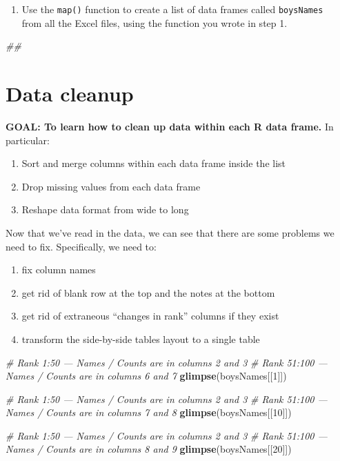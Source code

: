 \documentclass[
]{book}
\newenvironment{Shaded}{\begin{snugshade}}{\end{snugshade}}
\newcommand{\CommentTok}[1]{\textcolor[rgb]{0.56,0.35,0.01}{\textit{#1}}}
\newcommand{\DecValTok}[1]{\textcolor[rgb]{0.00,0.00,0.81}{#1}}
\newcommand{\KeywordTok}[1]{\textcolor[rgb]{0.13,0.29,0.53}{\textbf{#1}}}
\newcommand{\NormalTok}[1]{#1}
\providecommand{\tightlist}{%
  \setlength{\itemsep}{0pt}\setlength{\parskip}{0pt}}
\begin{document}
\begin{enumerate}
\def\labelenumi{\arabic{enumi}.}
\setcounter{enumi}{2}
\tightlist
\item
  Use the \texttt{map()} function to create a list of data frames called \texttt{boysNames}\\
  from all the Excel files, using the function you wrote in step 1.
\end{enumerate}

\begin{Shaded}
\begin{Highlighting}[]
\CommentTok{## }
\end{Highlighting}
\end{Shaded}

\hypertarget{data-cleanup}{%
\section{Data cleanup}\label{data-cleanup}}

\textbf{GOAL: To learn how to clean up data within each R data frame.} In particular:

\begin{enumerate}
\def\labelenumi{\arabic{enumi}.}
\tightlist
\item
  Sort and merge columns within each data frame inside the list
\item
  Drop missing values from each data frame
\item
  Reshape data format from wide to long
\end{enumerate}

Now that we've read in the data, we can see that there are some
problems we need to fix. Specifically, we need to:

\begin{enumerate}
\def\labelenumi{\arabic{enumi}.}
\tightlist
\item
  fix column names
\item
  get rid of blank row at the top and the notes at the bottom
\item
  get rid of extraneous ``changes in rank'' columns if they exist
\item
  transform the side-by-side tables layout to a single table
\end{enumerate}

\begin{Shaded}
\begin{Highlighting}[]
\CommentTok{# Rank 1:50 --- Names / Counts are in columns 2 and 3 }
\CommentTok{# Rank 51:100 --- Names / Counts are in columns 6 and 7}
\KeywordTok{glimpse}\NormalTok{(boysNames[[}\DecValTok{1}\NormalTok{]]) }

\CommentTok{# Rank 1:50 --- Names / Counts are in columns 2 and 3 }
\CommentTok{# Rank 51:100 --- Names / Counts are in columns 7 and 8}
\KeywordTok{glimpse}\NormalTok{(boysNames[[}\DecValTok{10}\NormalTok{]]) }

\CommentTok{# Rank 1:50 --- Names / Counts are in columns 2 and 3 }
\CommentTok{# Rank 51:100 --- Names / Counts are in columns 8 and 9}
\KeywordTok{glimpse}\NormalTok{(boysNames[[}\DecValTok{20}\NormalTok{]]) }
\end{Highlighting}
\end{Shaded}
\end{document}

